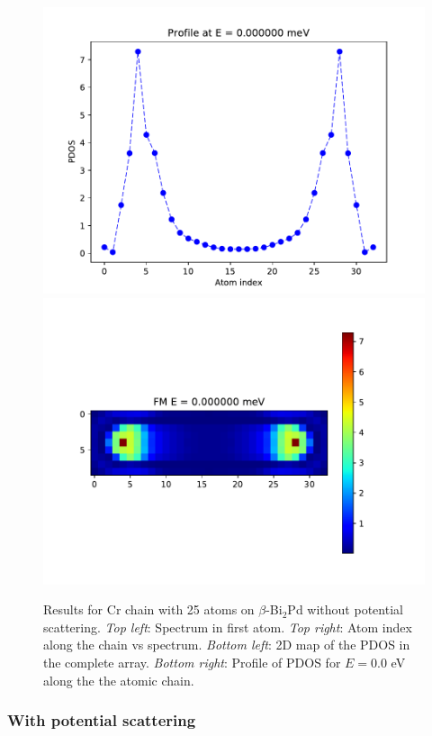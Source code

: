 \documentclass[letterpaper,12pt]{article}
\begin{document}
\begin{figure}[h!]
    \includegraphics[scale = .5]{profile.pdf}
    \includegraphics[scale = .5]{2D.pdf}
    
    \caption{Results for Cr chain with 25 atoms on $\beta$-Bi$_2$Pd without potential scattering. \textit{Top left}: Spectrum in first atom. \textit{Top right}: Atom index along the chain vs spectrum. \textit{Bottom left}: 2D map of the PDOS in the complete array. \textit{Bottom right}: Profile of PDOS for $E = 0.0$ eV along the the atomic chain.}
    \label{25Atoms}
\end{figure}


\subsubsection{With potential scattering}
\end{document}
